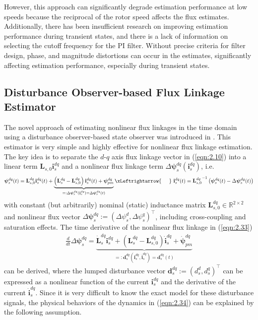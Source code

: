However, this approach can significantly degrade estimation performance at low speeds because the reciprocal of the rotor speed affects the flux estimates. Additionally, there has been insufficient research on improving estimation performance during transient states, and there is a lack of information on selecting the cutoff frequency for the PI filter. Without precise criteria for filter design, phase, and magnitude distortions can occur in the estimates, significantly affecting estimation performance, especially during transient states. 

\subsection{Disturbance Observer-based Flux Linkage Estimator \cite{c1_1}}\label{chap2:2.3.3}
The novel approach of estimating nonlinear flux linkages in the time domain using a disturbance observer-based state observer was introduced in \cite{c1_1}. This estimator is very simple and highly effective for nonlinear flux linkage estimation. The key idea is to separate the $d$-$q$ axis flux linkage vector in (\ref{eqn:2.10}) into a linear term $\mathbf{L}_{s,0}\mathbf{i}^{dq}_{s}$ and a nonlinear flux linkage term $\Delta\boldsymbol{\psi}^{dq}_s(\mathbf{i}^{dq}_s)$, i.e.
\begin{align}\label{eqn:2.33}
\bm{\psi}^{dq}_s(t) = \mathbf{L}^{dq}_{s,0} \mathbf{i}^{dq}_s(t) + \underbrace{\left( \mathbf{L}^{dq}_{s} - \mathbf{L}^{dq}_{s,0} \right) \mathbf{i}^{dq}_s(t) + \boldsymbol{\psi}^{dq}_{pm}}_{=:\Delta{\boldsymbol{\psi}^{dq}_s}(\mathbf{i}^{dq}_s)=\Delta{\boldsymbol{\psi}^{dq}_s}(t)} \xLeftrightarrow{\hspace{0.5cm}} \ \mathbf{i}^{dq}_s(t) = {\mathbf{L}^{dq}_{s,0}}^{-1}\left(\bm{\psi}^{dq}_s(t) - \Delta{\boldsymbol{\psi}^{dq}_s}(t)\right)
\end{align}
with constant (but arbitrarily) nominal (static) inductance matrix $\mathbf{L}^{dq}_{s,0} \in \mathbb{R}^{2\times 2}$ and nonlinear flux vector $\Delta\boldsymbol{\psi}^{dq}_s:=(\Delta{\psi}^{d}_s,\Delta{\psi}^{q}_s)^\top$, including cross-coupling and saturation effects. 
The time derivative of the nonlinear flux linkage in (\ref{eqn:2.33})
\begin{align}\label{eqn:2.34}
\frac{d}{dt}\Delta{\boldsymbol{\psi}^{dq}_s} = \underbrace{\mathbf{\dot L}^{dq}_{s} \mathbf{i}^{dq}_s + \left( \mathbf{L}^{dq}_{s} - \mathbf{L}^{dq}_{s,0} \right) \mathbf{\dot i}^{dq}_s + \boldsymbol{\dot \psi}^{dq}_{pm}}_{=:\mathbf{d}^{dq}_s(\mathbf{i}^{dq}_s,\mathbf{\dot i}^{dq}_s) = \mathbf{d}^{dq}_s(t)}
\end{align}  
can be derived, where the lumped disturbance vector $\mathbf{d}^{dq}_s:=(d^{d}_s,d^{q}_s)^\top$ can be expressed as a nonlinear function of the current $\mathbf{i}^{dq}_s$ and the derivative of the current $\mathbf{\dot i}^{dq}_s$. Since it is very difficult to know the exact model for these disturbance signals, the physical behaviors of the dynamics in (\ref{eqn:2.34}) can be explained by the following assumption.


